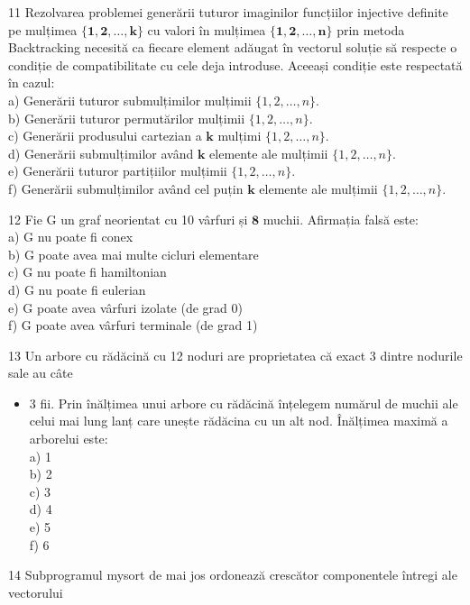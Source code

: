 11 Rezolvarea problemei generării tuturor imaginilor funcțiilor injective definite pe mulțimea $\{\mathbf{1}, \mathbf{2}, \ldots, \mathbf{k}\}$ cu valori în mulțimea $\{\mathbf{1}, \mathbf{2}, \ldots, \mathbf{n}\}$ prin metoda Backtracking necesită ca fiecare element adăugat în vectorul soluție să respecte o condiție de compatibilitate cu cele deja introduse. Aceeași condiție este respectată în cazul:\\
a) Generării tuturor submulțimilor mulțimii $\{1,2, \ldots, n\}$.\\
b) Generării tuturor permutărilor mulțimii $\{1,2, \ldots, n\}$.\\
c) Generării produsului cartezian a $\mathbf{k}$ mulțimi $\{1,2, \ldots, n\}$.\\
d) Generării submulțimilor având $\mathbf{k}$ elemente ale mulțimii $\{1,2, \ldots, n\}$.\\
e) Generării tuturor partițiilor mulțimii $\{1,2, \ldots, n\}$.\\
f) Generării submulțimilor având cel puțin $\mathbf{k}$ elemente ale mulțimii $\{1,2, \ldots, n\}$.

12 Fie G un graf neorientat cu 10 vârfuri și $\mathbf{8}$ muchii. Afirmația falsă este:\\
a) G nu poate fi conex\\
b) G poate avea mai multe cicluri elementare\\
c) G nu poate fi hamiltonian\\
d) G nu poate fi eulerian\\
e) G poate avea vârfuri izolate (de grad 0)\\
f) G poate avea vârfuri terminale (de grad 1)

13 Un arbore cu rădăcină cu 12 noduri are proprietatea că exact 3 dintre nodurile sale au câte

\begin{itemize}
  \item 3 fii. Prin înălțimea unui arbore cu rădăcină înțelegem numărul de muchii ale celui mai lung lanț care unește rădăcina cu un alt nod. Înălțimea maximă a arborelui este:\\
a) 1\\
b) 2\\
c) 3\\
d) 4\\
e) 5\\
f) 6
\end{itemize}

14 Subprogramul mysort de mai jos ordonează crescător componentele întregi ale vectorului

